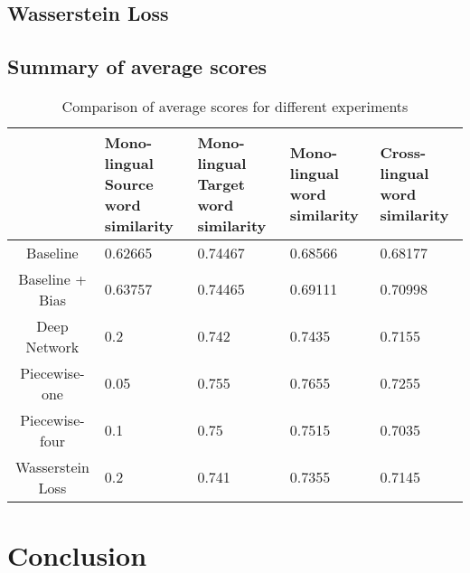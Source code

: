 \documentclass[11pt]{article}
\begin{document}
\subsection{Wasserstein Loss}

\subsection{Summary of average scores}
\begin{table}[h]
  \begin{center}
  \begin{tabular}{|c|l|l|l|l|}
  \hline
   & \multicolumn{1}{|p{1cm}|}{Mono-lingual Source word similarity}& \multicolumn{1}{|p{1cm}|}{Mono-lingual Target word similarity} & \multicolumn{1}{|p{1cm}|}{Mono-lingual word similarity} & \multicolumn{1}{|p{1cm}|}{Cross-lingual word similarity} \\
  \hline
  Baseline & 0.62665 & 0.74467 & 0.68566 & 0.68177  \\
  \hline
  Baseline + Bias & 0.63757 & 0.74465 & 0.69111 & 0.70998 \\
  \hline
  Deep Network & 0.2 & 0.742 & 0.7435 & 0.7155 \\
  \hline
  Piecewise-one & 0.05 & 0.755 & 0.7655 & 0.7255 \\
  \hline
  Piecewise-four & 0.1 & 0.75 & 0.7515 & 0.7035 \\
  \hline
  Wasserstein Loss & 0.2 & 0.741 & 0.7355 & 0.7145 \\
  \hline
  \end{tabular}
  \end{center}
  \caption{ Comparison of average scores for different experiments}
  \label{summary-table}
\end{table}

\section{Conclusion}





\end{document}
